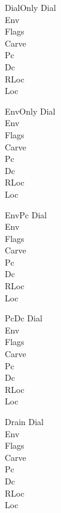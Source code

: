 \documentclass[a4paper,10pt,fleqn]{article}
\begin{document}
\begin{schema}{DialOnly}
  \Delta Dial \\ \Xi Env \\ \Xi Flags \\ \Xi Carve \\ \Xi Pc \\ \Xi Dc \\
  \Xi RLoc \\ \Xi Loc
\end{schema}

\begin{schema}{EnvOnly}
  \Xi Dial \\ \Delta Env \\ \Xi Flags \\ \Xi Carve \\ \Xi Pc \\ \Xi Dc \\
  \Xi RLoc \\ \Xi Loc
\end{schema}

\begin{schema}{EnvPc}
  \Xi Dial \\ \Delta Env \\ \Xi Flags \\ \Xi Carve \\ \Delta Pc \\ \Xi Dc \\
  \Xi RLoc \\ \Xi Loc
\end{schema}

\begin{schema}{PcDc}
  \Xi Dial \\ \Xi Env \\ \Xi Flags \\ \Xi Carve \\ \Delta Pc \\ \Delta Dc \\
  \Xi RLoc \\ \Xi Loc
\end{schema}

\begin{schema}{Drain}
  \Delta Dial \\ \Xi Env \\ \Xi Flags \\ \Xi Carve \\ \Delta Pc \\ \Xi Dc \\
  \Xi RLoc \\ \Delta Loc
\end{schema}
\end{document}
